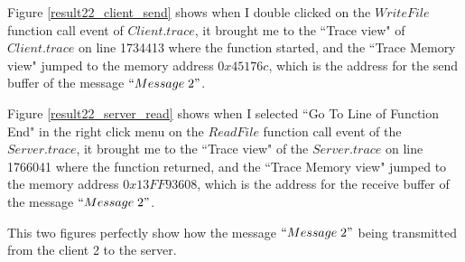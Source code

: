 Figure \ref{result22_client_send} shows when I double clicked on the $WriteFile$ function call event of $Client.trace$, it brought me to the ``Trace view" of $Client.trace$ on line 1734413 where the function started, and the ``Trace Memory view" jumped to the memory address $0x45176c$, which is the address for the send buffer of the message $``Message\; 2"$.

Figure \ref{result22_server_read} shows when I selected ``Go To Line of Function End" in the right click menu on the $ReadFile$ function call event of the $Server.trace$, it brought me to the ``Trace view" of the $Server.trace$ on line 1766041 where the function returned, and the ``Trace Memory view" jumped to the memory address $0x13FF93608$, which is the address for the receive buffer of the message $``Message\; 2"$.

This two figures perfectly show how the message $``Message\; 2"$ being transmitted from the client 2 to the server.


